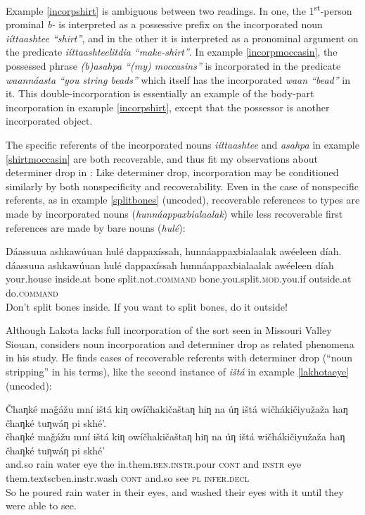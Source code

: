 \documentclass[output=paper]{LSP/langsci}
\begin{document}
Example \ref{incorpshirt} is ambiguous between two readings. In one, the 1\textsuperscript{st}-person prominal \emph{b-} is interpreted as a possessive prefix on the incorporated noun  \emph{iíttaashtee “shirt”}, and in the other it is interpreted as a pronominal argument on the predicate \emph{iíttaashteelitdia “make-shirt”}. In example \ref{incorpmoccasin}, the possessed phrase \emph{(b)asahpa “(my) moccasins”} is incorporated in the predicate \emph{waannáasta “you string beads”} which itself has the incorporated \emph{waan “bead”} in it. This double-incorporation is essentially an example of the body-part incorporation in example \ref{incorpshirt}, except that the possessor is another incorporated object.

	The specific referents of the incorporated nouns \emph{iíttaashtee} and \emph{asahpa} in example \ref{shirtmoccasin} are both recoverable, and thus fit my observations about determiner drop in : Like determiner drop, incorporation may be conditioned similarly by both nonspecificity and recoverability. Even in the case of nonspecific referents, as in example \ref{splitbones} (uncoded), recoverable references to types are made by incorporated nouns (\emph{‎hunnáappaxbialaalak}) while less recoverable first references are made by bare nouns (\emph{hulé}):
	 
\ea\label{splitbones}
 	Dáassuua ashkawúuan hulé dappaxíssah, hunnáappaxbialaalak awéeleen díah.\footnotemark\\
\gll	dáassuua		ashkawúuan		hulé		dappaxíssah				hunnáappaxbialaalak			awéeleen		díah\\
	your.house		inside.at		bone		split.not.\textsc{command}	bone.you.split.\textsc{mod}.you.if	outside.at		do.\textsc{command}\\
\glt	Don’t split bones inside. If you want to split bones, do it outside! 
\z

	Although Lakota lacks full incorporation of the sort seen in Missouri Valley Siouan, \citet{deReuse1994} considers noun incorporation and determiner drop as related phenomena in his study. He finds cases of recoverable referents with determiner drop (“noun stripping” in his terms), like the second instance of \emph{ištá} in example \ref{lakhotaeye} (uncoded):
	
\ea\label{lakhotaeye}
 	Čhaƞké maǧážu mní ištá kiƞ owíčhakičaštaƞ hiƞ na úƞ ištá wičhákičiyužaža haƞ čhaƞké tuƞwáƞ pi skhé’.\footnotemark\\
\gll	čhaƞké	maǧážu	mní	ištá	kiƞ	owíčhakičaštaƞ			hiƞ			na	úƞ			ištá		wičhákičiyužaža			haƞ			čhaƞké		tuƞwáƞ	pi		skhé’\\
	and.so	rain		water	eye	the	in.them.\textsc{ben.instr}.pour	\textsc{cont}	and	\textsc{instr}	eye		them.textsc{ben.instr}.wash	\textsc{cont}	and.so	see		\textsc{pl}	\textsc{infer.decl}\\
\glt	So he poured rain water in their eyes, and washed their eyes with it until they were able to see.
\z
\end{document}
